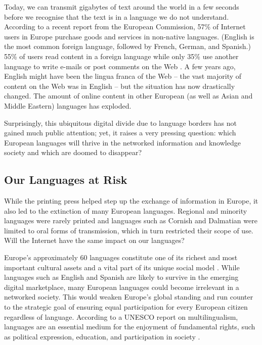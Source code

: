 \begin{multicols}{2}
Today, we can transmit gigabytes of text around the world in a few seconds before we recognise that the text is in a language we do not understand.  According to a recent report from the European Commission, 57\% of Internet users in Europe purchase goods and services in non-native languages.  (English is the most common foreign language, followed by French, German, and Spanish.) 55\% of users read content in a foreign language while only 35\% use another language to write e-mails or post comments on the Web \cite{Meta48}.  A few years ago, English might have been the lingua franca of the Web -- the vast majority of content on the Web was in English -- but the situation has now drastically changed.  The amount of online content in other European (as well as Asian and Middle Eastern) languages has exploded.

Surprisingly, this ubiquitous digital divide due to language borders has not gained much public attention; yet, it raises a very pressing question: which European languages will thrive in the networked information and knowledge society and which are doomed to disappear?

\subsection{Our Languages at Risk}

While the printing press helped step up the exchange of information in Europe, it also led to the extinction of many European languages.  Regional and minority languages were rarely printed and languages such as Cornish and Dalmatian were limited to oral forms of transmission, which in turn restricted their scope of use.  Will the Internet have the same impact on our languages?


Europe's approximately 60 languages constitute one of its richest and most important cultural assets and a vital part of its unique social model \cite{Meta49}.  While languages such as English and Spanish are likely to survive in the emerging digital marketplace, many European languages could become irrelevant in a networked society.  This would weaken Europe's global standing and run counter to the strategic goal of ensuring equal participation for every European citizen regardless of language.  According to a UNESCO report on multilingualism, languages are an essential medium for the enjoyment of fundamental rights, such as political expression, education, and participation in society \cite{Meta50}.


\end{multicols}
